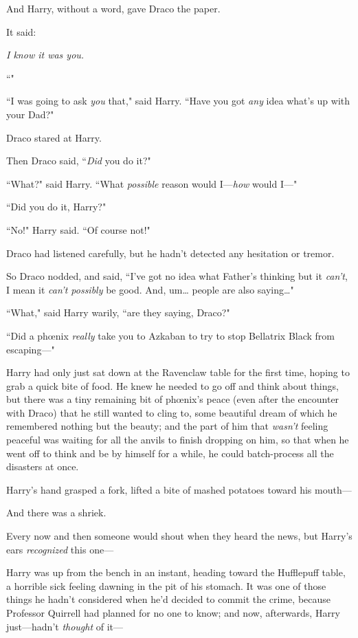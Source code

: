 And Harry, without a word, gave Draco the paper.

It said:

\emph{I know it was you.}

``\emph{}"

``I was going to ask \emph{you} that," said Harry. ``Have you got \emph{any} idea what's up with your Dad?"

Draco stared at Harry.

Then Draco said, ``\emph{Did} you do it?"

``What?" said Harry. ``What \emph{possible} reason would I---\emph{how} would I---"

``Did you do it, Harry?"

``No!" Harry said. ``Of course not!"

Draco had listened carefully, but he hadn't detected any hesitation or tremor.

So Draco nodded, and said, ``I've got no idea what Father's thinking but it \emph{can't}, I mean it \emph{can't possibly} be good. And, um{\ldots} people are also saying{\ldots}"

``What," said Harry warily, ``are they saying, Draco?"

``Did a phœnix \emph{really} take you to Azkaban to try to stop Bellatrix Black from escaping---"


Harry had only just sat down at the Ravenclaw table for the first time, hoping to grab a quick bite of food. He knew he needed to go off and think about things, but there was a tiny remaining bit of phœnix's peace (even after the encounter with Draco) that he still wanted to cling to, some beautiful dream of which he remembered nothing but the beauty; and the part of him that \emph{wasn't} feeling peaceful was waiting for all the anvils to finish dropping on him, so that when he went off to think and be by himself for a while, he could batch-process all the disasters at once.

Harry's hand grasped a fork, lifted a bite of mashed potatoes toward his mouth---

And there was a shriek.

Every now and then someone would shout when they heard the news, but Harry's ears \emph{recognized} this one---

Harry was up from the bench in an instant, heading toward the Hufflepuff table, a horrible sick feeling dawning in the pit of his stomach. It was one of those things he hadn't considered when he'd decided to commit the crime, because Professor Quirrell had planned for no one to know; and now, afterwards, Harry just---hadn't \emph{thought} of it---

